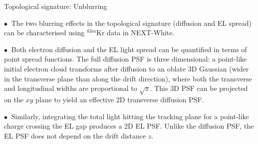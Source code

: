 \documentclass [aspectratio=169]{beamer}
\begin{document}
\begin{frame}{Topological signature: Unblurring}

$\bullet~$ The two blurring effects in the topological signature (diffusion and EL spread) can be characterised using $^{83m}$Kr data in NEXT-White. 

$\bullet~$ Both electron diffusion and the EL light spread can be quantified in terms of point spread functions. The full diffusion PSF is three dimensional: a point-like initial electron cloud transforms after diffusion to an oblate 3D Gaussian (wider in the transverse plane than along the drift direction), where both the transverse and longitudinal widths are proportional to $\sqrt{z}$. This 3D PSF can be projected on the $xy$ plane to yield an effective 2D transverse diffusion PSF. 

$\bullet~$ Similarly, integrating the total light hitting the tracking plane for a point-like charge crossing the EL gap produces a 2D EL PSF. Unlike the diffusion PSF, the EL PSF does not depend on the drift distance $z$.

\end{frame}
\end{document}
